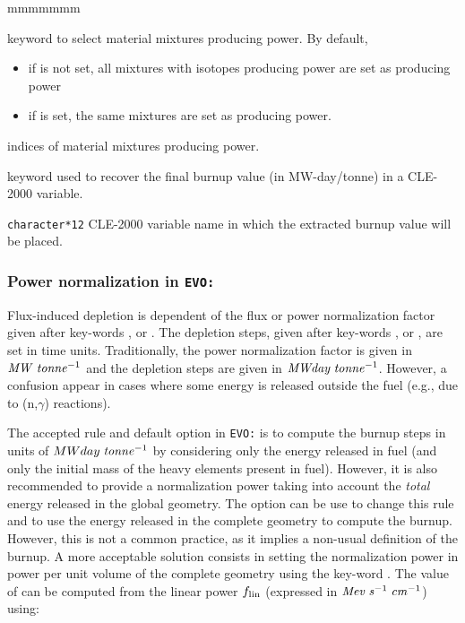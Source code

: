 \begin{ListeDeDescription}{mmmmmmm}
\item[\moc{MIXP}]  keyword to select material mixtures producing power. By default, 
\begin{itemize}
\item if  is not set, all mixtures with isotopes producing power are set as producing power
\item if  is set, the same mixtures  are set as producing power.
\end{itemize}

\item[\dusa{mixpwr}] indices of material mixtures producing power.

\item[\moc{PICK}]  keyword used to recover the final burnup value (in MW-day/tonne) in a CLE-2000 variable.

\item[\dusa{burnup}] \texttt{character*12} CLE-2000 variable name in which the extracted burnup value will be placed.

\end{ListeDeDescription}

\subsubsection{Power normalization in {\tt EVO:}}\label{sect:powerevo}

Flux-induced depletion is dependent of the flux or power normalization factor
given after key-words ,  or . The depletion
steps, given after key-words ,  or , are set
in time units. Traditionally, the power normalization factor is given in
${\it MW}\;{\it tonne}^{-1}$ and the depletion steps are given in
${\it MWday}\;{\it tonne}^{-1}$. However, a confusion appear in cases where
some energy is released outside the fuel (e.g., due to (n,$\gamma$) reactions).

\vskip 0.2cm

The accepted rule and default option in {\tt EVO:} is to compute the burnup
steps in units of $MWday\;{\it tonne}^{-1}$ by considering only the energy
released in fuel (and only the initial mass of the heavy elements present
in fuel). However, it is also recommended to provide a normalization power
taking into account the {\sl total} energy released in the global geometry.
The  option can be use to change this rule and to use
the energy released in the complete geometry to compute the burnup. However,
this is not a
common practice, as it implies a non-usual definition of the burnup.
A more acceptable solution consists in setting the normalization power
in power per unit volume of the complete geometry using the key-word
. The value of  can be computed from the linear
power $f_{\rm lin}$ (expressed in ${\it Mev}\;{\it s}^{-1}\;{\it cm}^{-1}$)
using:

